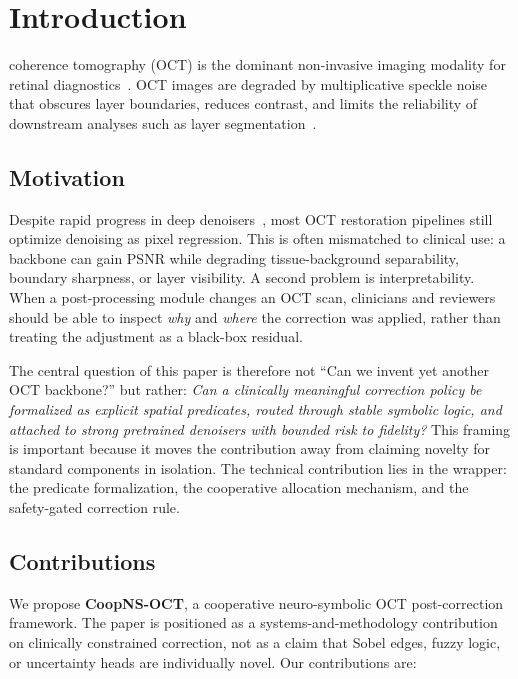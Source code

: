 \documentclass{ieeetj}
\begin{document}
\section{Introduction}
\label{sec:introduction}
 coherence tomography (OCT) is the dominant non-invasive imaging modality for retinal diagnostics~\cite{huang1991optical}. OCT images are degraded by multiplicative speckle noise~\cite{goodman2007speckle} that obscures layer boundaries, reduces contrast, and limits the reliability of downstream analyses such as layer segmentation~\cite{devalla2018drunet}.

\subsection{Motivation}
Despite rapid progress in deep denoisers~\cite{zhang2017beyond,chen2022simple,liang2021swinir,krull2019noise2void}, most OCT restoration pipelines still optimize denoising as pixel regression. This is often mismatched to clinical use: a backbone can gain PSNR while degrading tissue-background separability, boundary sharpness, or layer visibility. A second problem is interpretability. When a post-processing module changes an OCT scan, clinicians and reviewers should be able to inspect \emph{why} and \emph{where} the correction was applied, rather than treating the adjustment as a black-box residual.

The central question of this paper is therefore not ``Can we invent yet another OCT backbone?'' but rather: \emph{Can a clinically meaningful correction policy be formalized as explicit spatial predicates, routed through stable symbolic logic, and attached to strong pretrained denoisers with bounded risk to fidelity?} This framing is important because it moves the contribution away from claiming novelty for standard components in isolation. The technical contribution lies in the wrapper: the predicate formalization, the cooperative allocation mechanism, and the safety-gated correction rule.

\subsection{Contributions}
We propose \textbf{CoopNS-OCT}, a cooperative neuro-symbolic OCT post-correction framework. The paper is positioned as a systems-and-methodology contribution on clinically constrained correction, not as a claim that Sobel edges, fuzzy logic, or uncertainty heads are individually novel. Our contributions are:
\end{document}
